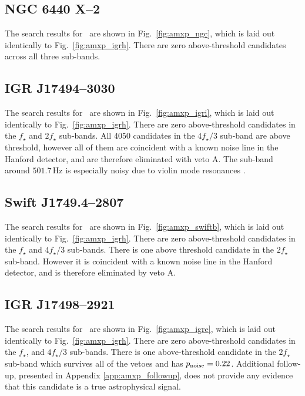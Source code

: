 \subsection{NGC 6440 X--2   \label{sec:amxp_ngc} }
The search results for \ngc\ are shown in Fig.~\ref{fig:amxp_ngc}, which is laid out identically to Fig.~\ref{fig:amxp_igrh}. There are zero above-threshold candidates across all three sub-bands.

\subsection{IGR J17494--3030  \label{sec:amxp_igri} }
The search results for \igri\ are shown in Fig.~\ref{fig:amxp_igri}, which is laid out identically to Fig.~\ref{fig:amxp_igrh}. There are zero above-threshold candidates in the $f_\star$ and $2f_\star$ sub-bands. All 4050 candidates in the $4f_\star/3$ sub-band are above threshold, however all of them are coincident with a known noise line in the Hanford detector, and are therefore eliminated with veto A. The sub-band around $501.7\,$Hz is especially noisy due to violin mode resonances \cite{o23DetChar}.

\subsection{Swift J1749.4--2807 \label{sec:amxp_swiftb} }
The search results for \swiftb\ are shown in Fig.~\ref{fig:amxp_swiftb}, which is laid out identically to Fig.~\ref{fig:amxp_igrh}. There are zero above-threshold candidates in the $f_\star$ and $4f_\star / 3$ sub-bands. There is one above threshold candidate in the $2 f_\star$ sub-band. However it is coincident with a known noise line in the Hanford detector, and is therefore eliminated by veto A.

\subsection{IGR J17498--2921  \label{sec:amxp_igre} }
The search results for \igre\ are shown in Fig.~\ref{fig:amxp_igre}, which is laid out identically to Fig.~\ref{fig:amxp_igrh}. There are zero above-threshold candidates in the $f_\star$, and $4f_\star / 3$ sub-bands. There is one above-threshold candidate in the $2f_\star$ sub-band which survives all of the vetoes and has $p_{\rm noise}=0.22$. Additional follow-up, presented in Appendix \ref{app:amxp_followup}, does not provide any evidence that this candidate is a true astrophysical signal.

